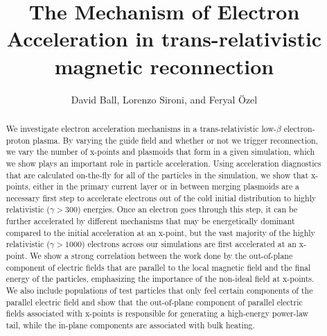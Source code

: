 \documentclass[iop,twocolappendix]{emulateapj}
\begin{document}
\title{The Mechanism of Electron Acceleration in trans-relativistic magnetic reconnection}

\author{David Ball, Lorenzo Sironi, and Feryal \"Ozel}



\begin{abstract}
We investigate electron acceleration mechanisms in a trans-relativistic low-$\beta$ electron-proton plasma.  By varying the guide field and whether or not we trigger reconnection, we vary the number of x-points and plasmoids that form in a given simulation, which we show plays an important role in particle acceleration.  Using acceleration diagnostics that are calculated on-the-fly for all of the particles in the simulation, we show that x-points, either in the primary current layer or in between merging plasmoids are a necessary first step to accelerate electrons out of the cold initial distribution to highly relativistic ($\gamma > 300$) energies.  Once an electron goes through this step, it can be further accelerated by different mechanisms that may be energetically dominant compared to the initial acceleration at an x-point, but the vast majority of the highly relativistic ($\gamma > 1000$) electrons across our simulations are first accelerated at an x-point.  We show a strong correlation between the work done by the out-of-plane component of electric fields that are parallel to the local magnetic field and the final energy of the particles, emphasizing the importance of the non-ideal field at x-points.  We also include populations of test particles that only feel certain components of the parallel electric field and show that the out-of-plane component of parallel electric fields associated with x-points is responsible for generating a high-energy power-law tail, while the in-plane components are associated with bulk heating.




\end{abstract}
\end{document}
